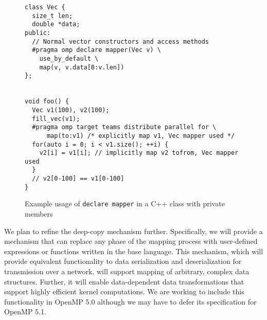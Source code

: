 \begin{figure}
\begin{verbatim}
class Vec {
  size_t len;
  double *data;
public:
  // Normal vector constructors and access methods
  #pragma omp declare mapper(Vec v) \
    use_by_default \
    map(v, v.data[0:v.len])
};


void foo() {
  Vec v1(100), v2(100);
  fill_vec(v1);
  #pragma omp target teams distribute parallel for \
      map(to:v1) /* explicitly map v1, Vec mapper used */
  for(auto i = 0; i < v1.size(); ++i) { 
    v2[i] = v1[i]; // implicitly map v2 tofrom, Vec mapper used
  }
  // v2[0-100] == v1[0-100]
}
\end{verbatim}
\caption{Example usage of \texttt{declare mapper} in a C++ class with private
members}
\label{fig:mapper}
\end{figure}

We plan to refine the deep-copy mechanism further. Specifically, we will 
provide a mechanism that can replace any phase of the mapping process with 
user-defined expressions or functions written in the base language. This 
mechanism, which will provide equivalent functionality to data  serialization 
and deserialization for transmission over a network,  will support mapping 
of arbitrary, complex data structures. Further, it will enable data-dependent 
data transformations that support highly efficient kernel computations. We
are working to include this functionality in OpenMP 5.0 although we may
have to defer its specification for OpenMP 5.1.




